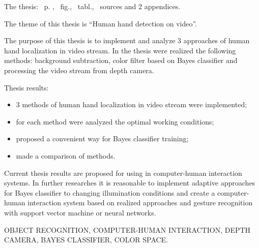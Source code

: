 
The thesis: \pageref*{MyLastPage}~p. , \totfig~fig., \tottab~tabl., ~sources and 2 appendices.

The theme of this thesis is ``Human hand detection on video''.

The purpose of this thesis is to implement and analyze 3 approaches of human hand localization in video stream. In the thesis were realized the following methods: background subtraction, color filter based on Bayes classifier and processing the video stream from depth camera.

Thesis results:
\begin{itemize}
	\item 3 methods of human hand localization in video stream were implemented;
	\item for each method were analyzed the optimal working conditions;
	\item proposed a convenient way for Bayes classifier training;
	\item made a comparison of methods.
\end{itemize}

Current thesis results are proposed for using in computer-human interaction systems. In further researches it is reasonable to implement adaptive approaches for Bayes classifier to changing illumination conditions and create a computer-human interaction system based on realized approaches and gesture recognition with support vector machine or neural networks.

\MakeUppercase{Object recognition, computer-human interaction, depth camera, Bayes classifier, color space.} 